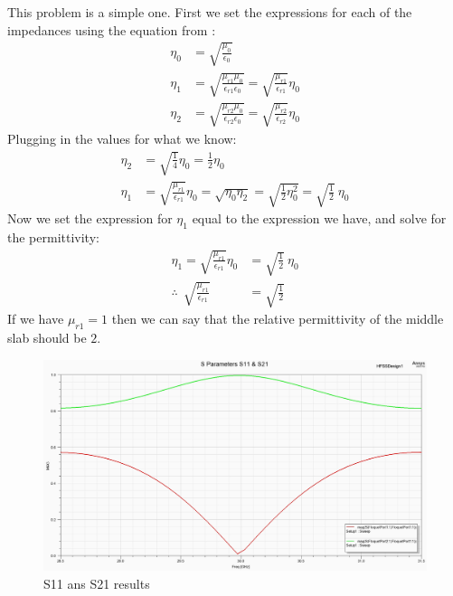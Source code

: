 \documentclass[12pt]{article}
\begin{document}
This problem is a simple one. First we set the expressions for each of the impedances using the equation from \cite{balanis_2012}:
\begin{align*}
  \eta_0 &= \sqrt{\frac{\mu_0}{\epsilon_0}}\\
  \eta_1 &= \sqrt{\frac{\mu_{r1}\mu_{0}}{\epsilon_{r1}\epsilon_{0}}} = \sqrt{\frac{\mu_{r1}}{\epsilon_{r1}}}\eta_0\\
  \eta_2 &= \sqrt{\frac{\mu_{r2}\mu_{0}}{\epsilon_{r2}\epsilon_{0}}} = \sqrt{\frac{\mu_{r2}}{\epsilon_{r2}}}\eta_0
\end{align*}
Plugging in the values for what we know:
\begin{align*}
  \eta_2 &= \sqrt{\frac{1}{4}}\eta_0 = \frac{1}{2}\eta_0\\
  \eta_1 &= \sqrt{\frac{\mu_{r1}}{\epsilon_{r1}}}\eta_0 = \sqrt{\eta_0\eta_2} = \sqrt{\frac{1}{2}\eta_0^2} = \sqrt{\frac{1}{2}}\ \eta_0
\end{align*}
Now we set the expression for $\eta_1$ equal to the expression we have, and solve for the permittivity:
\newpage
\begin{align*}
  \eta_1 = \sqrt{\frac{\mu_{r1}}{\epsilon_{r1}}}\eta_0 &= \sqrt{\frac{1}{2}}\ \eta_0\\
  \therefore\ \ \sqrt{\frac{\mu_{r1}}{\epsilon_{r1}}} &= \sqrt{\frac{1}{2}}
\end{align*}
If we have $\mu_{r1} = 1$ then we can say that the relative permittivity of the middle slab should be $2$.
\begin{center}
\begin{figure}[h]
    \centering
    \includegraphics[width=17cm]{./images/Go1_5-9_final.png}
    \caption{S11 ans S21 results}
    \label{fig:S11_21}
  \end{figure}
\end{center}
\end{document}
